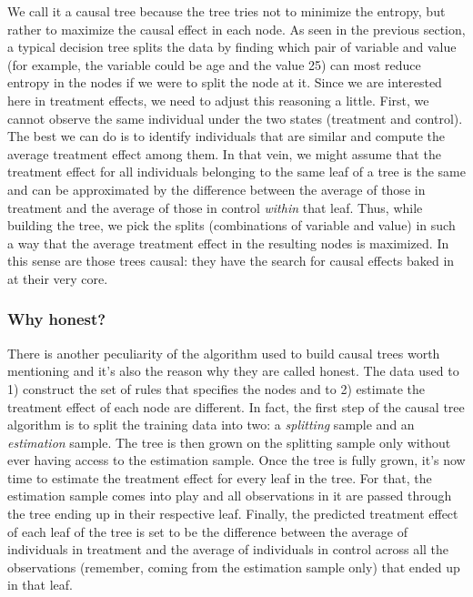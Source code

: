 We call it a causal tree because the tree tries not to minimize the entropy, but rather to maximize the causal effect in each node. As seen in the previous section, a typical decision tree splits the data by finding which pair of variable and value (for example, the variable could be age and the value 25) can most reduce entropy in the nodes if we were to split the node at it. Since we are interested here in treatment effects, we need to adjust this reasoning a little. First, we cannot observe the same individual under the two states (treatment and control). The best we can do is to identify individuals that are similar and compute the average treatment effect among them. In that vein, we might assume that the treatment effect for all individuals belonging to the same leaf of a tree is the same and can be approximated by the difference between the average of those in treatment and the average of those in control \textit{within} that leaf. Thus, while building the tree, we pick the splits (combinations of variable and value) in such a way that the average treatment effect in the resulting nodes is maximized. In this sense are those trees causal: they have the search for causal effects baked in at their very core.

\subsubsection{Why honest?}

There is another peculiarity of the algorithm used to build causal trees worth mentioning and it's also the reason why they are called honest. The data used to 1) construct the set of rules that specifies the nodes and to 2) estimate the treatment effect of each node are different. In fact, the first step of the causal tree algorithm is to split the training data into two: a \textit{splitting} sample and an \textit{estimation} sample. The tree is then grown on the splitting sample only without ever having access to the estimation sample. Once the tree is fully grown, it's now time to estimate the treatment effect for every leaf in the tree. For that, the estimation sample comes into play and all observations in it are passed through the tree ending up in their respective leaf. Finally, the predicted treatment effect of each leaf of the tree is set to be the difference between the average of individuals in treatment and the average of individuals in control across all the observations (remember, coming from the estimation sample only) that ended up in that leaf.

